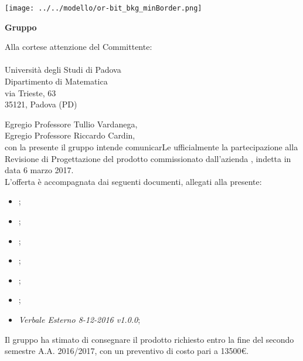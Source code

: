   
\begin{titlepage}
	
	\begin{center}
	 	
	\texttt{[image: ../../modello/or-bit\_bkg\_minBorder.png]} 
	\begin{Huge} 
	 	\textbf{Gruppo \GroupName{}}
	\end{Huge}
	\end{center}
	
	\vspace{0,5cm}
	\begin{large}
	\begin{flushright}
		Alla cortese attenzione del Committente: \\
		\Committente \\
		Università degli Studi di Padova \\
		Dipartimento di Matematica \\
		via Trieste, 63 \\
		35121, Padova (PD) 
		
		
	
	\end{flushright}

	\vspace{0,5cm}
	
	Egregio Professore Tullio Vardanega,\\
	Egregio Professore Riccardo Cardin, \\
	
	con la presente il gruppo \GroupName{} intende comunicarLe ufficialmente la partecipazione alla Revisione di Progettazione del prodotto \ProjectName{} commissionato dall'azienda \Proponente{}, indetta in data 6 marzo 2017.\\	
	
	L'offerta è accompagnata dai seguenti documenti, allegati alla presente:
	\begin{itemize}
		\item \AnalisiDeiRequisiti{};
		\item \Glossario{};
		\item \NormeDiProgetto{};
		\item \PianoDiProgetto{};
		\item \PianoDiQualifica{};
		\item \SpecificaTecnica{};
		\item \emph{Verbale Esterno 8-12-2016 v1.0.0};
	\end{itemize}
	\vspace{0.3cm}
	Il gruppo \GroupName{} ha stimato di consegnare il prodotto richiesto entro la fine del secondo semestre A.A. 2016/2017, con un preventivo di costo pari a 13500€.\\
	

\end{large}
\end{titlepage}
